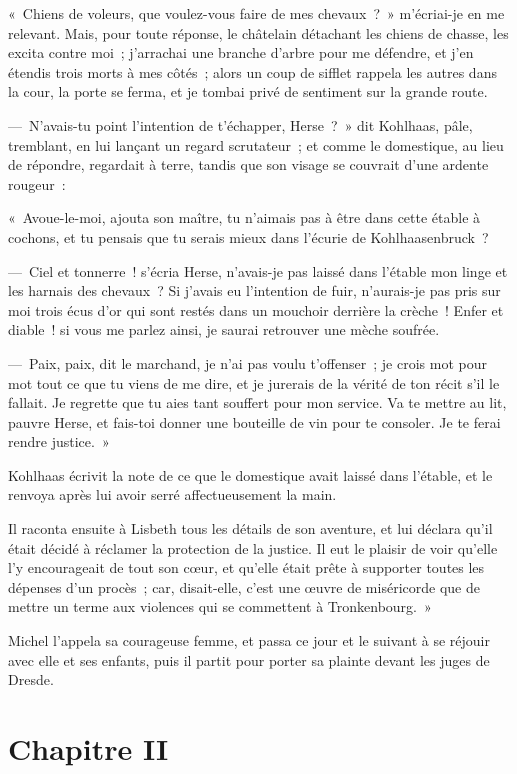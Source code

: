 \documentclass[french,twoside]{book} %
\newcommand\chapteropen{} %
\newcommand\chapterclose{} %
\begin{document}
« Chiens de voleurs, que voulez-vous faire de mes chevaux ? » m’écriai-je en me relevant. Mais, pour toute réponse, le châtelain détachant les chiens de chasse, les excita contre moi ; j’arrachai une branche d’arbre pour me défendre, et j’en étendis trois morts à mes côtés ; alors un coup de sifflet rappela les autres dans la cour, la porte se ferma, et je tombai privé de sentiment sur la grande route.\par
— N’avais-tu point l’intention de t’échapper, Herse ? » dit Kohlhaas, pâle, tremblant, en lui lançant un regard scrutateur ; et comme le domestique, au lieu de répondre, regardait à terre, tandis que son visage se couvrait d’une ardente rougeur :\par
« Avoue-le-moi, ajouta son maître, tu n’aimais pas à être dans cette étable à cochons, et tu pensais que tu serais mieux dans l’écurie de Kohlhaasenbruck ?\par
— Ciel et tonnerre ! s’écria Herse, n’avais-je pas laissé dans l’étable mon linge et les harnais des chevaux ? Si j’avais eu l’intention de fuir, n’aurais-je pas pris sur moi trois écus d’or qui sont restés dans un mouchoir derrière la crèche ! Enfer et diable ! si vous me parlez ainsi, je saurai retrouver une mèche soufrée.\par
— Paix, paix, dit le marchand, je n’ai pas voulu t’offenser ; je crois mot pour mot tout ce que tu viens de me dire, et je jurerais de la vérité de ton récit s’il le fallait. Je regrette que tu aies tant souffert pour mon service. Va te mettre au lit, pauvre Herse, et fais-toi donner une bouteille de vin pour te consoler. Je te ferai rendre justice. »\par
Kohlhaas écrivit la note de ce que le domestique avait laissé dans l’étable, et le renvoya après lui avoir serré affectueusement la main.\par
Il raconta ensuite à Lisbeth tous les détails de son aventure, et lui déclara qu’il était décidé à réclamer la protection de la justice. Il eut le plaisir de voir qu’elle l’y encourageait de tout son cœur, et qu’elle était prête à supporter toutes les dépenses d’un procès ; car, disait-elle, c’est une œuvre de miséricorde que de mettre un terme aux violences qui se commettent à Tronkenbourg. »\par
Michel l’appela sa courageuse femme, et passa ce jour et le suivant à se réjouir avec elle et ses enfants, puis il partit pour porter sa plainte devant les juges de Dresde.
\chapterclose


\chapteropen
\chapter[{Chapitre II}]{Chapitre II}\renewcommand{\leftmark}{Chapitre II}
\end{document}

